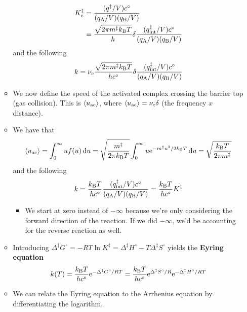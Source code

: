 \documentclass[../notes.tex]{subfiles}
\begin{document}
\begin{itemize}
\begin{itemize}
        \begin{align*}
            K_c^\ddagger &= \frac{(q^\ddagger/V)c^\circ}{(q_{\ce{A}}/V)(q_{\ce{B}}/V)}\\
            &= \frac{\sqrt{2\pi m^\ddagger\kB T}}{h}\delta\frac{(q_\text{int}^\ddagger/V)c^\circ}{(q_{\ce{A}}/V)(q_{\ce{B}}/V)}
        \end{align*}
        and the following
        \begin{equation*}
            k = \nu_c\frac{\sqrt{2\pi m^\ddagger\kB T}}{hc^\circ}\delta\frac{(q_\text{int}^\ddagger/V)c^\circ}{(q_{\ce{A}}/V)(q_{\ce{B}}/V)}
        \end{equation*}
        \item We now define the speed of the activated complex crossing the barrier top (gas collision). This is $\prb{u_\text{ac}}$, where $\prb{u_\text{ac}}=\nu_c\delta$ (the frequency $x$ distance).
        \item We have that
        \begin{equation*}
            \prb{u_\text{ac}} = \int_0^\infty uf(u)\dd{u}
            = \sqrt{\frac{m^\ddagger}{2\pi\kB T}}\int_0^\infty u\e[-m^\ddagger u^2/2\kB T]\dd{u}
            = \sqrt{\frac{\kB T}{2\pi m^\ddagger}}
        \end{equation*}
        and the following
        \begin{equation*}
            k = \frac{\kB T}{hc^\circ}\frac{(q_\text{int}^\ddagger/V)c^\circ}{(q_{\ce{A}}/V)(q_{\ce{B}}/V)}
            = \frac{\kB T}{hc^\circ}K^\ddagger
        \end{equation*}
        \begin{itemize}
            \item We start at zero instead of $-\infty$ because we're only considering the forward direction of the reaction. If we did $-\infty$, we'd be accounting for the reverse reaction as well.
        \end{itemize}
        \item Introducing $\Delta^\ddagger G^\circ=-RT\ln K^\ddagger=\Delta^\ddagger H^\circ-T\Delta^\ddagger S^\circ$ yields the \textbf{Eyring equation}
        \begin{equation*}
            k(T) = \frac{\kB T}{hc^\circ}\e[-\Delta^\ddagger G^\circ/RT]
            = \frac{\kB T}{hc^\circ}\e[\Delta^\ddagger S^\circ/R]\e[-\Delta^\ddagger H^\circ/RT]
        \end{equation*}
        \item We can relate the Eyring equation to the Arrhenius equation by differentiating the logarithm.

\end{itemize}
\end{itemize}
\end{document}
